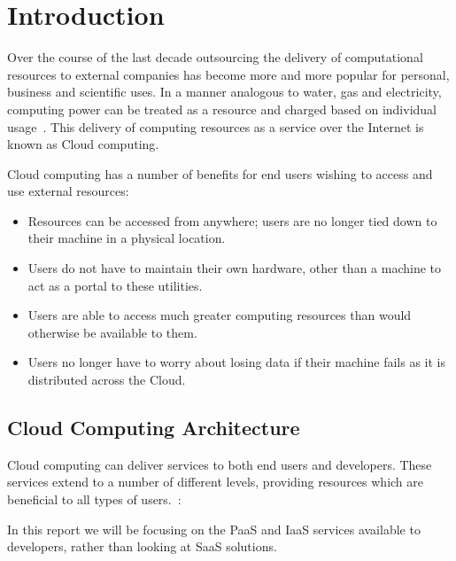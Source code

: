 \chapter{Introduction}
Over the course of the last decade outsourcing the delivery of computational
resources to external companies has become more and more popular for personal,
business and scientific uses. In a manner analogous to water, gas and
electricity, computing power can be treated as a resource and charged based on
individual usage~\cite{Aneka}. This delivery of computing resources as a
service over the Internet is known as Cloud computing. 

Cloud computing has a number of benefits for end users wishing to access and
use external resources:
\begin{itemize}
\item Resources can be accessed from anywhere; users are no longer tied down to their machine in a physical location.
\item Users do not have to maintain their own hardware, other than a machine to act as a portal to these utilities.
\item Users are able to access much greater computing resources than would otherwise be available to them.
\item Users no longer have to worry about losing data if their machine fails as it is distributed across the Cloud.
\end{itemize}

\section{Cloud Computing Architecture}
Cloud computing can deliver services to both end users and developers. These
services extend to a number of different levels, providing resources which are beneficial to all types of users.~\cite{Aneka}:
\begin{itemize}
\end{itemize}

In this report we will be focusing on the PaaS and IaaS services available to developers, rather than looking at SaaS solutions. 

